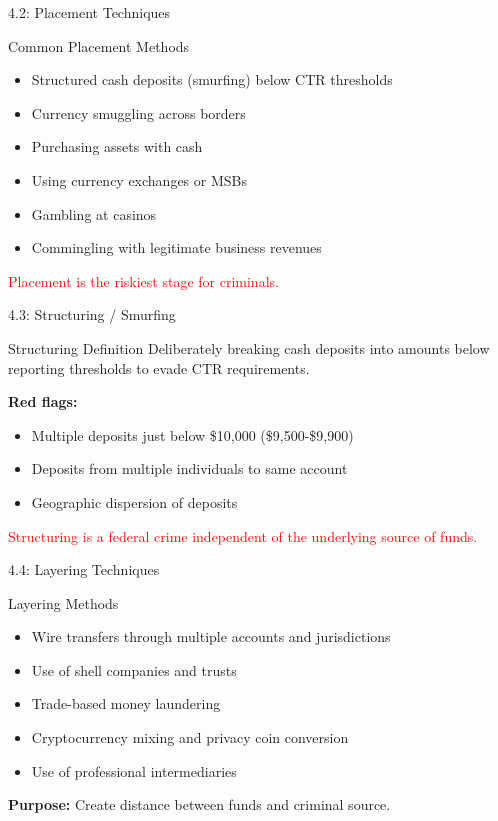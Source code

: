 \documentclass{beamer}
\begin{document}
	\begin{frame}{4.2: Placement Techniques}
		\begin{block}{Common Placement Methods}
			\begin{itemize}
				\item Structured cash deposits (smurfing) below CTR thresholds
				\item Currency smuggling across borders
				\item Purchasing assets with cash
				\item Using currency exchanges or MSBs
				\item Gambling at casinos
				\item Commingling with legitimate business revenues
			\end{itemize}
		\end{block}
		\textcolor{red}{Placement is the riskiest stage for criminals.}
	\end{frame}
	
	\begin{frame}{4.3: Structuring / Smurfing}
		\begin{block}{Structuring Definition}
			Deliberately breaking cash deposits into amounts below reporting thresholds to evade CTR requirements.
		\end{block}
		\textbf{Red flags:}
		\begin{itemize}
			\item Multiple deposits just below \$10,000 (\$9,500-\$9,900)
			\item Deposits from multiple individuals to same account
			\item Geographic dispersion of deposits
		\end{itemize}
		\textcolor{red}{Structuring is a federal crime independent of the underlying source of funds.}
	\end{frame}
	
	\begin{frame}{4.4: Layering Techniques}
		\begin{block}{Layering Methods}
			\begin{itemize}
				\item Wire transfers through multiple accounts and jurisdictions
				\item Use of shell companies and trusts
				\item Trade-based money laundering
				\item Cryptocurrency mixing and privacy coin conversion
				\item Use of professional intermediaries
			\end{itemize}
		\end{block}
		\textbf{Purpose:} Create distance between funds and criminal source.
	\end{frame}
	
\end{document}
